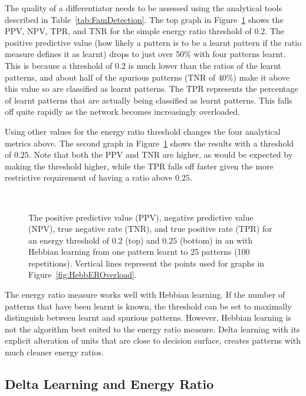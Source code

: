 The quality of a differentiator needs to be assessed using the analytical tools described in Table~\ref{tab:FamDetection}. The top graph in Figure~\ref{fig:ERpatterns0-14} shows the PPV, NPV, TPR, and TNR for the simple energy ratio threshold of $0.2$.  The positive predictive value (how likely a pattern is to be a learnt pattern if the ratio measure defines it as learnt) drops to just over 50\% with four patterns learnt.  This is because a threshold of $0.2$ is much lower than the ratios of the learnt patterns, and about half of the spurious patterns (TNR of 40\%) make it above this value so are classified as learnt patterns.  The TPR represents the percentage of learnt patterns that are actually being classified as learnt patterns.  This falls off quite rapidly as the network becomes increasingly overloaded.

Using other values for the energy ratio threshold changes the four analytical metrics above.  The second graph in Figure~\ref{fig:ERpatterns0-14} shows the results with a threshold of $0.25$.  Note that both the PPV and TNR are higher, as would be expected by making the threshold higher, while the TPR falls off faster given the more restrictive requirement of having a ratio above $0.25$.

\begin{figure}[p]
\center
\small
	
	\vspace{1cm}\\
	
	\caption{The positive predictive value (PPV), negative predictive value (NPV), true negative rate (TNR), and true positive rate (TPR) for an energy threshold of $0.2$ (top) and  $0.25$ (bottom) in an  with Hebbian learning from one pattern learnt to 25 patterns (100 repetitions).  Vertical lines represent the points used for graphs in Figure~\ref{fig:HebbEROverload}.}
	\label{fig:ERpatterns0-14}
\end{figure}


The energy ratio measure works well with Hebbian learning.  If the number of patterns that have been learnt is known, the threshold can be set to maximally distinguish between learnt and spurious patterns.  However, Hebbian learning is not the algorithm  best suited to the energy ratio measure.  Delta learning with its explicit alteration of units that are close to decision surface, creates patterns with much cleaner energy ratios.



\subsection{Delta Learning and Energy Ratio}

